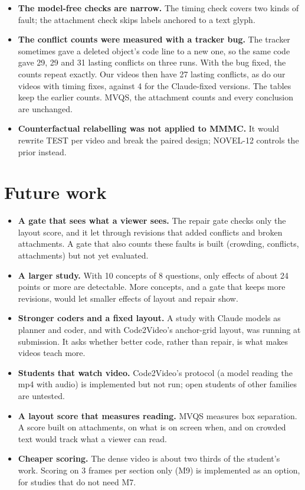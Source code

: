 \begin{itemize}
  gain on 3 frames (M9) but not on the dense video (M7).
  \item \textbf{The model-free checks are narrow.} The timing check covers two kinds of fault; the attachment check
  skips labels anchored to a text glyph.
  \item \textbf{The conflict counts were measured with a tracker bug.} The tracker sometimes gave a deleted object's
  code line to a new one, so the same code gave 29, 29 and 31 lasting conflicts on three runs. With the bug fixed,
  the counts repeat exactly. Our videos then have 27 lasting conflicts, as do our videos with timing fixes, against 4
  for the Claude-fixed versions. The tables keep the earlier counts. MVQS, the attachment counts and every
  conclusion are unchanged.
  \item \textbf{Counterfactual relabelling was not applied to MMMC.} It would rewrite TEST per video and break the
  paired design; NOVEL-12 controls the prior instead.
\end{itemize}

\section{Future work}

\begin{itemize}
  \item \textbf{A gate that sees what a viewer sees.} The repair gate checks only the layout score, and it let through
  revisions that added conflicts and broken attachments. A gate that also counts these faults is built (crowding,
  conflicts, attachments) but not yet evaluated.
  \item \textbf{A larger study.} With 10 concepts of 8 questions, only effects of about 24 points or more are
  detectable. More concepts, and a gate that keeps more revisions, would let smaller effects of layout and repair show.
  \item \textbf{Stronger coders and a fixed layout.} A study with Claude models as planner and coder, and with
  Code2Video's anchor-grid layout, was running at submission. It asks whether better code, rather than repair,
  is what makes videos teach more.
  \item \textbf{Students that watch video.} Code2Video's protocol (a model reading the mp4 with audio) is implemented
  but not run; open students of other families are untested.
  \item \textbf{A layout score that measures reading.} MVQS measures box separation. A score built on attachments, on
  what is on screen when, and on crowded text would track what a viewer can read.
  \item \textbf{Cheaper scoring.} The dense video is about two thirds of the student's work. Scoring on 3 frames per
  section only (M9) is implemented as an option, for studies that do not need M7.
\end{itemize}

